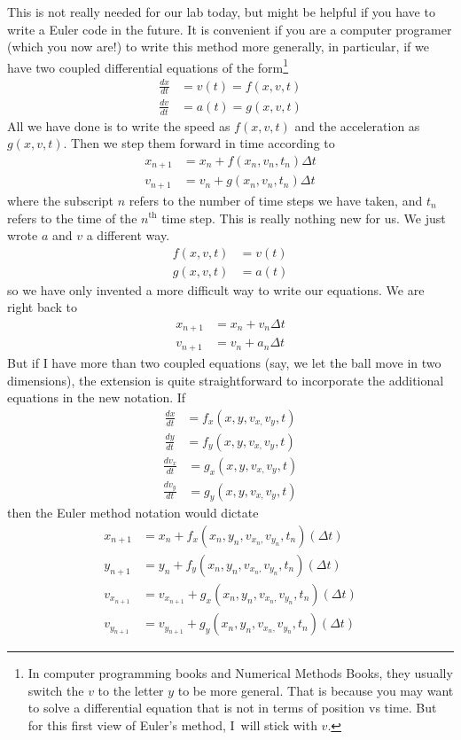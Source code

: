\documentclass[twoside,11pt,ShortChapTitles]{BYUTextbook}
\begin{document}
This is not really needed for our lab today, but might be helpful if you have
to write a Euler code in the future. It is convenient if you are a computer
programer (which you now are!) to write this method more generally, in
particular, if we have two coupled differential equations of the
form\footnote{In computer programming books and Numerical Methods Books, they
usually switch the $v$ to the letter $y$ to be more general. That is because
you may want to solve a differential equation that is not in terms of position
vs time. But for this first view of Euler's method, I\ will stick with $v.$}
\begin{align*}
\frac{dx}{dt}  & =v\left(  t\right)  =f(x,v,t)\\
\frac{dv}{dt}  & =a\left(  t\right)  =g(x,v,t)
\end{align*}
All we have done is to write the speed as $f(x,v,t)$ and the acceleration as
$g(x,v,t).$ Then we step them forward in time according to \begin{align*}
x_{n+1}  & =x_{n}+f(x_{n},v_{n},t_{n})\Delta t\\
v_{n+1}  & =v_{n}+g(x_{n},v_{n},t_{n})\Delta t
\end{align*}
where the subscript $n$ refers to the number of time steps we have taken, and
$t_{n}$ refers to the time of the $n^{\text{th}}$ time step. This is really
nothing new for us. We just wrote $a$ and $v$ a different way.
\begin{align*}
f(x,v,t)  & =v\left(  t\right) \\
g(x,v,t)  & =a\left(  t\right)
\end{align*}
so we have only invented a more difficult way to write our equations. We are
right back to
\begin{align*}
x_{n+1}  & =x_{n}+v_{n}\Delta t\\
v_{n+1}  & =v_{n}+a_{n}\Delta t
\end{align*}
But if I have more than two coupled equations (say, we let the ball move in
two dimensions), the extension is quite straightforward to incorporate the
additional equations in the new notation. If
\begin{align*}
\frac{dx}{dt}  & =f_{x}(x,y,v_{x,}v_{y},t)\\
\frac{dy}{dt}  & =f_{y}(x,y,v_{x,}v_{y},t)
\end{align*} \begin{align*}
\frac{dv_{x}}{dt}  & =g_{x}(x,y,v_{x,}v_{y},t)\\
\frac{dv_{y}}{dt}  & =g_{y}(x,y,v_{x,}v_{y},t)
\end{align*}
then the Euler method notation would dictate
\begin{align*}
x_{n+1}  & =x_{n}+f_{x}(x_{n},y_{n},v_{x_{n},}v_{y_{n}},t_{n})(\Delta t)\\
y_{n+1}  & =y_{n}+f_{y}(x_{n},y_{n},v_{x_{n},}v_{y_{n}},t_{n})(\Delta t)\\
v_{x_{n+1}}  & =v_{x_{n+1}}+g_{x}(x_{n},y_{n},v_{x_{n},}v_{y_{n}} ,t_{n})(\Delta t)\\
v_{y_{n+1}}  & =v_{y_{n+1}}+g_{y}(x_{n},y_{n},v_{x_{n},}v_{y_{n}} ,t_{n})(\Delta t)
\end{align*}
\end{document}
